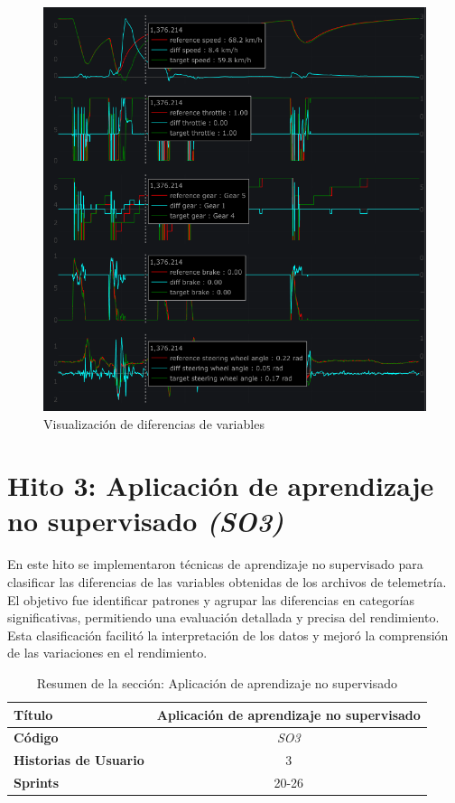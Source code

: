 \begin{figure}[H]
	\centering
	\includegraphics[width=1\linewidth]{./figs/herramientas/desarrollo/visualizacion.png}
	\caption[Visualización de diferencias de variables]{Visualización de diferencias de variables}
    \label{fig:visualizacion}
\end{figure}
\vspace{2em}

\newpage



\section{Hito 3: Aplicación de aprendizaje no supervisado \textit{(SO3)}}

En este hito se implementaron técnicas de aprendizaje no supervisado para clasificar las diferencias de las variables obtenidas de los archivos de telemetría. El objetivo fue identificar patrones y agrupar las diferencias en categorías significativas, permitiendo una evaluación detallada y precisa del rendimiento. Esta clasificación facilitó la interpretación de los datos y mejoró la comprensión de las variaciones en el rendimiento.

\begin{table}[H]
\centering
\begin{tabular}{|l|c|}
\hline
\textbf{Título} & Aplicación de aprendizaje no supervisado \\ \hline
\textbf{Código} & \textit{SO3} \\ \hline
\textbf{Historias de Usuario} & 3 \\ \hline
\textbf{Sprints} & 20-26 \\ \hline
\end{tabular}
\caption{Resumen de la sección: Aplicación de aprendizaje no supervisado}
\label{tab
}
\end{table}

